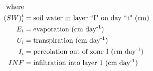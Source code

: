 \documentclass[fleqn, oneside, 11pt]{article}%
\begin{document}
\begin{preview}
\begin{align*}%
\text{where} \nonumber \\
(SW)^{t}_i & =  \text{soil water in layer ``I" on day ``t" (cm)} \nonumber \\
E_i & =  \text{evaporation (cm day\textsuperscript{-1})} \nonumber \\
U_i & =  \text{transpiration (cm day\textsuperscript{-1})} \nonumber \\
I_i & =  \text{percolation out of zone I (cm day\textsuperscript{-1})} \nonumber \\
INF & =  \text{infiltration into layer 1 (cm day\textsuperscript{-1})} \nonumber \\
\end{align*} 
\end{preview}
\end{document}
